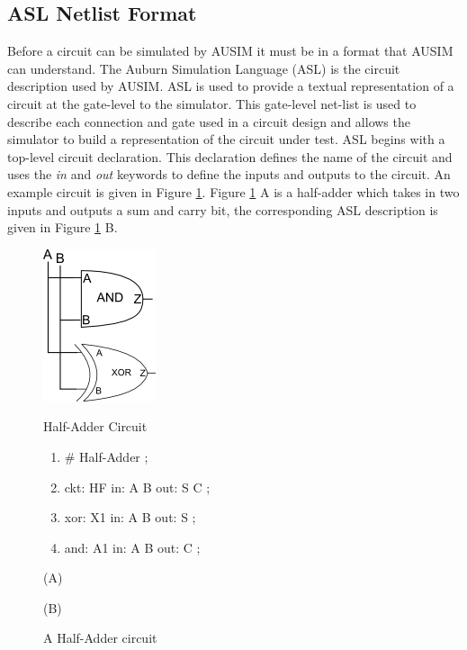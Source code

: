 \documentclass[12pt]{report}
\begin{document}
\subsection{ASL Netlist Format}
Before a circuit can be simulated by AUSIM it must be in a format that AUSIM can understand.  The Auburn Simulation Language (ASL) is the circuit description used by AUSIM\cite{asl}.  ASL is used to provide a textual representation of a circuit at the gate-level to the simulator.  This gate-level net-list is used to describe each connection and gate used in a circuit design and allows the simulator to build a representation of the circuit under test.  ASL begins with a top-level circuit declaration.  This declaration defines the name of the circuit and uses the \textit{in} and \textit{out} keywords to define the inputs and outputs to the circuit.  An example circuit is given in Figure \ref{fig:half_adder}.  Figure \ref{fig:half_adder} A is a half-adder which takes in two inputs and outputs a sum and carry bit, the corresponding ASL description is given in Figure \ref{fig:half_adder} B.
\begin{figure}
	\begin{center}
		\begin{minipage}[l]{.45\textwidth}
			\includegraphics[scale=1]{images/half-adder}	
		\end{minipage}
		\begin{minipage}[r]{.45\textwidth}
			\begin{center}
				Half-Adder Circuit
			\end{center}
			\begin{enumerate}
				\setlength{\itemsep}{0cm}
				\item \# Half-Adder ;
				\item ckt: HF in: A B out: S C ;
				\item xor: X1 in: A B out: S ;
				\item and: A1 in: A B out: C ;
			\end{enumerate}
		\end{minipage}
	\end{center}
	\begin{center}
		\begin{minipage}[l]{.45\textwidth}
			(A)
		\end{minipage}
		\begin{minipage}[r]{.45\textwidth}
			(B)
		\end{minipage}
	\end{center}
	\caption{A Half-Adder circuit}
	\label{fig:half_adder}
\end{figure}
\end{document}
